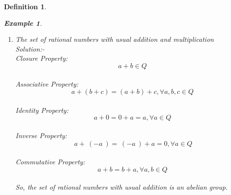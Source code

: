 \documentclass{article}
\newtheorem{defn}{Definition} [section]
\newtheorem{ex}{Example}[section]
\begin{document}
\begin{defn}
\begin{ex}
\begin{enumerate}
	\\Associative Property: $$a+(b+c)=(a+b)+c, \forall a,b,c \in R$$
	\\Identity Property: $$a+0=0+a=a, \forall a \in R$$
	\\Inverse Property: $$ \ a + \ (-a\ ) =\ (-a\ ) + a = 0, \forall a \in R$$
	\\Commutative Property: $$a+b=b+a,\forall a,b \in R$$
	\\So, the set of real numbers with usual addition is an abelian group.\\
	\\For multiplication:
	\begin{itemize}
	    \item Closure: $$\forall a, b \in R \Rightarrow a*b \in R$$
        \item Associative: $$a*(b*c)=(a*b)*c, \forall a,b,c \in R$$
	    \item Identity: For any $a \in R$, $1$ is an identity element of $R$ such that, $$a*1=1*a=a$$ .
		\item Distributive of $+$ over $*$:\\
	        $a*(b+c)=(a*b)+ (a*c)$  $ \forall a,b,c \in R $ \\
	        $(a+b)*c=(a*c)+(b*c)$   $ \forall a,b,c \in R $ \\
	   \item Commutative: $$a*b=b*a  \forall a,b \in R$$ \\
	   \item Multiplicative Inverse: $$a*a^{-1}= a^{-1} * a = 1 , \forall a^{-1} \in R$$\\
	    \\Therefore the set of real numbers with usual addition and multiplication is a field.
	 \end{itemize}
	\item The set of rational numbers with usual addition and multiplication
	\\ Solution:- 	\\Closure Property: $$a+b \in Q$$
	\\Associative Property: $$a+(b+c)=(a+b)+c, \forall a,b,c \in Q$$
	\\Identity Property: $$a+0=0+a=a, \forall a \in Q$$
	\\Inverse Property: $$ \ a + \ (-a\ ) =\ (-a\ ) + a = 0, \forall a \in Q$$
	\\Commutative Property: $$a+b=b+a,\forall a,b \in Q$$
	\\So, the set of rational numbers with usual addition is an abelian group.\\

\end{enumerate}
\end{ex}
\end{defn}
\end{document}
